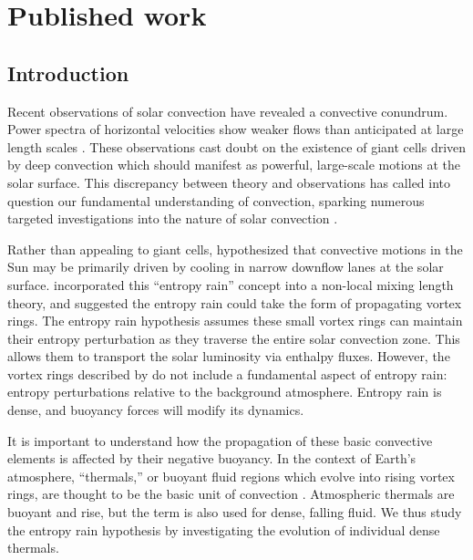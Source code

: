 \section{Published work}
\label{sec:alb19_published}

\subsection{Introduction}
\label{sec:intro}
Recent observations of solar convection have revealed a convective conundrum.
Power spectra of horizontal velocities show weaker flows than anticipated at large length scales \citep{hanasoge&all2012, greer&all2015}.
These observations cast doubt on the existence of giant cells driven by deep convection which should manifest as powerful, large-scale motions at the solar surface. 
This discrepancy between theory and observations has called into question our fundamental understanding of convection, sparking numerous targeted investigations into the nature of solar convection  \citep{featherstone&hindman2016a, omara&all2016, cossette&rast2016, kapyla&all2017, hotta2017}.

Rather than appealing to giant cells, \citet{spruit1997} hypothesized that convective motions in the Sun may be primarily driven by cooling in narrow downflow lanes at the solar surface.
\citet{brandenburg2016} incorporated this ``entropy rain'' concept into a non-local mixing length theory, and suggested the entropy rain could take the form of propagating vortex rings.
The entropy rain hypothesis assumes these small vortex rings can maintain their entropy perturbation as they traverse the entire solar convection zone.
This allows them to transport the solar luminosity via enthalpy fluxes.
However, the vortex rings described by \citet{brandenburg2016} do not include a fundamental aspect of entropy rain: entropy perturbations relative to the background atmosphere.
Entropy rain is dense, and buoyancy forces will modify its dynamics.

It is important to understand how the propagation of these basic convective elements is affected by their negative buoyancy. 
In the context of Earth's atmosphere, ``thermals,'' or buoyant fluid regions which evolve into rising vortex rings, are thought to be the basic unit of convection \cite[e.g.,][]{romps&all2015}. 
Atmospheric thermals are buoyant and rise, but the term is also used for dense, falling fluid.
We thus study the entropy rain hypothesis by investigating the evolution of individual dense thermals.


